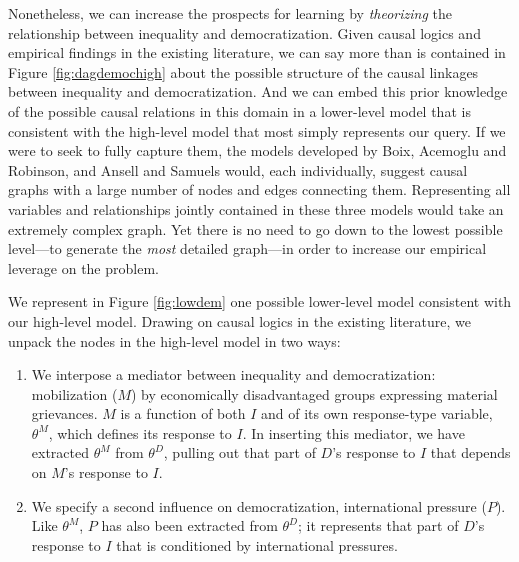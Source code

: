 \documentclass[
  12pt,
]{book}
\begin{document}
Nonetheless, we can increase the prospects for learning by \emph{theorizing} the relationship between inequality and democratization. Given causal logics and empirical findings in the existing literature, we can say more than is contained in Figure \ref{fig:dagdemochigh} about the possible structure of the causal linkages between inequality and democratization. And we can embed this prior knowledge of the possible causal relations in this domain in a lower-level model that is consistent with the high-level model that most simply represents our query. If we were to seek to fully capture them, the models developed by Boix, Acemoglu and Robinson, and Ansell and Samuels would, each individually, suggest causal graphs with a large number of nodes and edges connecting them. Representing all variables and relationships jointly contained in these three models would take an extremely complex graph. Yet there is no need to go down to the lowest possible level---to generate the \emph{most} detailed graph---in order to increase our empirical leverage on the problem.

We represent in Figure \ref{fig:lowdem} one possible lower-level model consistent with our high-level model. Drawing on causal logics in the existing literature, we unpack the nodes in the high-level model in two ways:

\begin{enumerate}
\def\labelenumi{\arabic{enumi}.}
\item
  We interpose a mediator between inequality and democratization: mobilization (\(M\)) by economically disadvantaged groups expressing material grievances. \(M\) is a function of both \(I\) and of its own response-type variable, \(\theta^M\), which defines its response to \(I\). In inserting this mediator, we have extracted \(\theta^M\) from \(\theta^D\), pulling out that part of \(D\)'s response to \(I\) that depends on \(M\)'s response to \(I\).
\item
  We specify a second influence on democratization, international pressure (\(P\)). Like \(\theta^M\), \(P\) has also been extracted from \(\theta^D\); it represents that part of \(D\)'s response to \(I\) that is conditioned by international pressures.
\end{enumerate}
\end{document}

